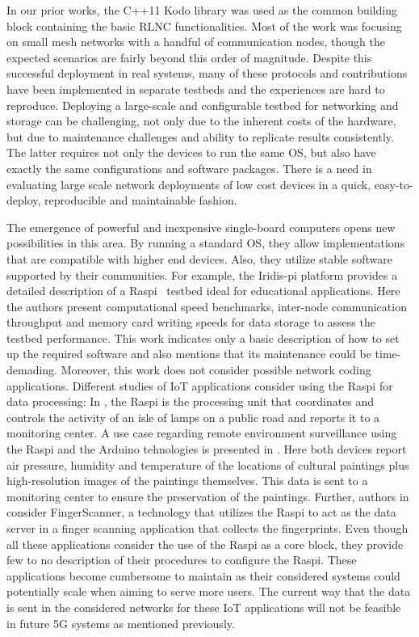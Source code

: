 In our prior works, the C++11 Kodo library \cite{kodo2011pedersen} was used as the common building block containing the basic \ac{RLNC} functionalities. Most of the work was focusing on small mesh networks with a handful of communication nodes, though the expected scenarios are fairly beyond this order of magnitude. Despite this successful deployment in real systems, many of these protocols and contributions have been implemented in separate testbeds and the experiences are hard to reproduce. Deploying a large-scale and configurable testbed for networking and storage can be challenging, not only due to the inherent costs of the hardware, but due to maintenance challenges and ability to replicate results consistently. The latter requires not only the devices to run the same \ac{OS}, but also have exactly the same configurations and software packages. There is a need in evaluating large scale network deployments of low cost devices in a quick, easy-to-deploy, reproducible and maintainable fashion.

The emergence of powerful and inexpensive single-board computers opens new possibilities in this area. By running a standard \ac{OS}, they allow implementations that are compatible with higher end devices. Also, they utilize stable software supported by their communities. For example, the Iridis-pi platform \cite{cox2014iridis} provides a detailed description of a \ac{Raspi}~\cite{making_of_pi} testbed ideal for educational applications. Here the authors present computational speed benchmarks, inter-node communication throughput and memory card writing speeds for data storage to assess the testbed performance. This work indicates only a basic description of how to set up the required software and also mentions that its maintenance could be time-demading. Moreover, this work does not consider possible network coding applications. Different studies of \ac{IoT} applications consider using the \ac{Raspi} for data processing: In \cite{leccese2014smartcity}, the \ac{Raspi} is the processing unit that coordinates and controls the activity of an isle of lamps on a public road and reports it to a monitoring center. A use case regarding remote environment surveillance using the Raspi and the Arduino \cite{arduino} tehnologies is presented in \cite{leccese2014newimaging}. Here both devices report air pressure, humidity and temperature of the locations of cultural paintings plus high-resolution images of the paintings themselves. This data is sent to a monitoring center to ensure the preservation of the paintings. Further, authors in \cite{sapes2016finger} consider FingerScanner, a technology that utilizes the \ac{Raspi} to act as the data server in a finger scanning application that collects the fingerprints. Even though all these applications consider the use of the \ac{Raspi} as a core block, they provide few to no description of their procedures to configure the \ac{Raspi}. These applications become cumbersome to maintain as their considered systems could potentially scale when aiming to serve more users. The current way that the data is sent in the considered networks for these \ac{IoT} applications will not be feasible in future 5G systems as mentioned previously.

